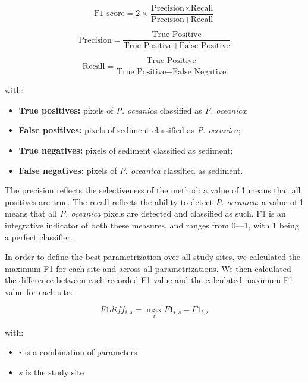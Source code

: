 \begin{equation}
\text{F1-score}=2\times\frac{\text{Precision}\times\text{Recall}}{\text{Precision}+\text{Recall}}
\label{eq3.1}
\end{equation}

\begin{equation}
\text{Precision}=\frac{\text{True Positive}}{\text{True Positive}+\text{False Positive}}
\label{eq3.2}
\end{equation}

\begin{equation}
\text{Recall}=\frac{\text{True Positive}}{\text{True Positive}+\text{False Negative}}
\label{eq3.3}
\end{equation}

with:

\begin{itemize}
\item \textbf{True positives:} pixels of \textit{P. oceanica} classified as \textit{P. oceanica};
\item \textbf{False positives:} pixels of sediment classified as \textit{P. oceanica};
\item \textbf{True negatives:} pixels of sediment classified as sediment;
\item \textbf{False negatives:} pixels of \textit{P. oceanica} classified as sediment.
\end{itemize}

The precision reflects the selectiveness of the method: a value of 1 means that all positives are true. The recall reflects the ability to detect \textit{P. oceanica}: a value of 1 means that all \textit{P. oceanica} pixels are detected and classified as such. F1 is an integrative indicator of both these measures, and ranges from 0---1, with 1 being a perfect classifier.

In order to define the best parametrization over all study sites, we calculated the maximum F1 for each site and across all parametrizations. We then calculated the difference between each recorded F1 value and the calculated maximum F1 value for each site:

\begin{equation}
    F1diff_{i,s}=\max_i{F1_{i,s}}-F1_{i,s}
    \label{eq3.4}
\end{equation}

with:
\begin{itemize}
\item $i$ is a combination of parameters
\item $s$ is the study site
\end{itemize}

